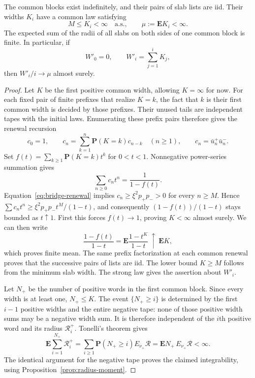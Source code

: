 \begin{proposition}
\label{prop:common-blocks}
The common blocks exist indefinitely, and their pairs of slab lists are
iid. Their widths $K_i$ have a common law satisfying
\[
                  M\le K_i<\infty\quad\text{a.s.},
             \qquad \mu:=\mathbf E K_i<\infty.
\]
The expected sum of the radii of all slabs on both sides of one common
block is finite. In particular, if
\begin{equation}
 W'_0=0,\qquad W'_i=\sum_{j=1}^iK_j,
 \label{eq:common-width-sums}
\end{equation}
then $W'_i/i\to\mu$ almost surely.
\end{proposition}

\begin{proof}
Let $K$ be the first positive common width, allowing $K=\infty$ for now.
For each fixed pair of finite prefixes that realize $K=k$, the fact
that $k$ is their first common width is decided by those prefixes. Their
unused tails are independent tapes with the initial laws. Enumerating
these prefix pairs therefore gives the renewal recursion
\[
 c_0=1,\qquad
 c_n=\sum_{k=1}^n\mathbf P(K=k)c_{n-k}\quad(n\ge1),
 \qquad c_n=\bar u_n^+\bar u_n^-.
\]
Set $f(t)=\sum_{k\ge1}\mathbf P(K=k)t^k$ for $0<t<1$. Nonnegative
power-series summation gives
\[
 \sum_{n\ge0}c_nt^n=\frac{1}{1-f(t)}.
\]
Equation~\eqref{eq:bridge-renewal} implies
$c_n\ge\xi^2p_+p_->0$ for every $n\ge M$. Hence
$\sum c_nt^n\ge\xi^2p_+p_-t^M/(1-t)$, and consequently
$(1-f(t))/(1-t)$ stays bounded as $t\uparrow1$. First this forces
$f(t)\to1$, proving $K<\infty$ almost surely. We can then write
\[
 \frac{1-f(t)}{1-t}
  =\mathbf E\frac{1-t^K}{1-t}\ \uparrow\ \mathbf E K,
\]
which proves finite mean. The same prefix factorization at each common
renewal proves that the successive pairs of lists are iid. The lower
bound $K\ge M$ follows from the minimum slab width. The strong law gives
the assertion about $W'_i$.

Let $N_+$ be the number of positive words in the first common block.
Since every width is at least one, $N_+\le K$. The event $\{N_+\ge i\}$
is determined by the first $i-1$ positive widths and the entire negative
tape: none of those positive width sums may be a negative width sum.
It is therefore independent of the $i$th positive word and its radius
$\mathcal R_i^+$. Tonelli's theorem gives
\[
 \mathbf E\sum_{i=1}^{N_+}\mathcal R_i^+
  =\sum_{i\ge1}\mathbf P(N_+\ge i)E_{\nu_+}\mathcal R
  =\mathbf E N_+\,E_{\nu_+}\mathcal R<\infty.
\]
The identical argument for the negative tape proves the claimed
integrability, using Proposition~\ref{prop:radius-moment}.
\end{proof}

